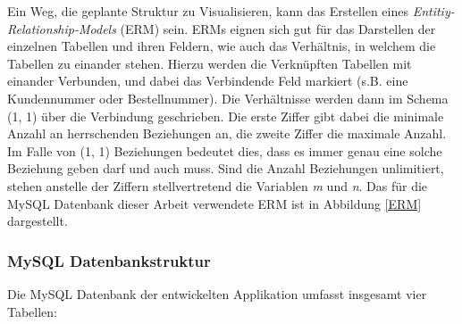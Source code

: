 \documentclass[../main.tex]{subfiles}
\begin{document}
	Ein Weg, die geplante Struktur zu Visualisieren, kann das Erstellen eines \emph{Entitiy-Relationship-Models} (ERM) sein. ERMs eignen sich gut für das Darstellen der einzelnen Tabellen und ihren Feldern, wie auch das Verhältnis, in welchem die Tabellen zu einander stehen. Hierzu werden die Verknüpften Tabellen mit einander Verbunden, und dabei das Verbindende Feld markiert (s.B. eine Kundennummer oder Bestellnummer). Die Verhältnisse werden dann im Schema (1, 1) über die Verbindung geschrieben. Die erste Ziffer gibt dabei die minimale Anzahl an herrschenden Beziehungen an, die zweite Ziffer die maximale Anzahl. Im Falle von (1, 1) Beziehungen bedeutet dies, dass es immer genau eine solche Beziehung geben darf und auch muss. Sind die Anzahl Beziehungen unlimitiert, stehen anstelle der Ziffern stellvertretend die Variablen \emph{m} und \emph{n}. Das für die MySQL Datenbank dieser Arbeit verwendete ERM ist in Abbildung \ref{ERM} dargestellt.
	
	\subsubsection{MySQL Datenbankstruktur} \label{MySQLStructure}
	Die MySQL Datenbank der entwickelten Applikation umfasst insgesamt vier Tabellen:
	
\end{document}
